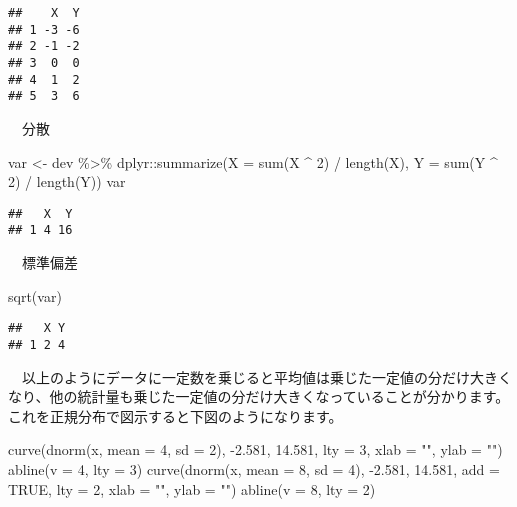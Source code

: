 \documentclass[
  12pt,
]{book}
\newenvironment{Shaded}{\begin{snugshade}}{\end{snugshade}}
\newcommand{\AttributeTok}[1]{\textcolor[rgb]{0.77,0.63,0.00}{#1}}
\newcommand{\ConstantTok}[1]{\textcolor[rgb]{0.00,0.00,0.00}{#1}}
\newcommand{\DecValTok}[1]{\textcolor[rgb]{0.00,0.00,0.81}{#1}}
\newcommand{\FloatTok}[1]{\textcolor[rgb]{0.00,0.00,0.81}{#1}}
\newcommand{\FunctionTok}[1]{\textcolor[rgb]{0.00,0.00,0.00}{#1}}
\newcommand{\NormalTok}[1]{#1}
\newcommand{\OtherTok}[1]{\textcolor[rgb]{0.56,0.35,0.01}{#1}}
\newcommand{\SpecialCharTok}[1]{\textcolor[rgb]{0.00,0.00,0.00}{#1}}
\newcommand{\StringTok}[1]{\textcolor[rgb]{0.31,0.60,0.02}{#1}}
\begin{document}
\begin{verbatim}
##    X  Y
## 1 -3 -6
## 2 -1 -2
## 3  0  0
## 4  1  2
## 5  3  6
\end{verbatim}

　分散

\begin{Shaded}
\begin{Highlighting}[]
\NormalTok{var }\OtherTok{\textless{}{-}}\NormalTok{ dev }\SpecialCharTok{\%\textgreater{}\%} 
\NormalTok{  dplyr}\SpecialCharTok{::}\FunctionTok{summarize}\NormalTok{(}\AttributeTok{X =} \FunctionTok{sum}\NormalTok{(X }\SpecialCharTok{\^{}} \DecValTok{2}\NormalTok{) }\SpecialCharTok{/} \FunctionTok{length}\NormalTok{(X), }\AttributeTok{Y =} \FunctionTok{sum}\NormalTok{(Y }\SpecialCharTok{\^{}} \DecValTok{2}\NormalTok{) }\SpecialCharTok{/} \FunctionTok{length}\NormalTok{(Y))}
\NormalTok{var}
\end{Highlighting}
\end{Shaded}

\begin{verbatim}
##   X  Y
## 1 4 16
\end{verbatim}

　標準偏差

\begin{Shaded}
\begin{Highlighting}[]
\FunctionTok{sqrt}\NormalTok{(var)}
\end{Highlighting}
\end{Shaded}

\begin{verbatim}
##   X Y
## 1 2 4
\end{verbatim}

　以上のようにデータに一定数を乗じると平均値は乗じた一定値の分だけ大きくなり、他の統計量も乗じた一定値の分だけ大きくなっていることが分かります。これを正規分布で図示すると下図のようになります。

\begin{Shaded}
\begin{Highlighting}[]
\FunctionTok{curve}\NormalTok{(}\FunctionTok{dnorm}\NormalTok{(x, }\AttributeTok{mean =} \DecValTok{4}\NormalTok{, }\AttributeTok{sd =} \DecValTok{2}\NormalTok{), }\SpecialCharTok{{-}}\FloatTok{2.581}\NormalTok{, }\FloatTok{14.581}\NormalTok{, }\AttributeTok{lty =} \DecValTok{3}\NormalTok{,}
      \AttributeTok{xlab =} \StringTok{""}\NormalTok{, }\AttributeTok{ylab =} \StringTok{""}\NormalTok{)}
\FunctionTok{abline}\NormalTok{(}\AttributeTok{v =} \DecValTok{4}\NormalTok{, }\AttributeTok{lty =} \DecValTok{3}\NormalTok{)}
\FunctionTok{curve}\NormalTok{(}\FunctionTok{dnorm}\NormalTok{(x, }\AttributeTok{mean =} \DecValTok{8}\NormalTok{, }\AttributeTok{sd =} \DecValTok{4}\NormalTok{), }\SpecialCharTok{{-}}\FloatTok{2.581}\NormalTok{, }\FloatTok{14.581}\NormalTok{, }\AttributeTok{add =} \ConstantTok{TRUE}\NormalTok{, }\AttributeTok{lty =} \DecValTok{2}\NormalTok{,}
      \AttributeTok{xlab =} \StringTok{""}\NormalTok{, }\AttributeTok{ylab =} \StringTok{""}\NormalTok{)}
\FunctionTok{abline}\NormalTok{(}\AttributeTok{v =} \DecValTok{8}\NormalTok{, }\AttributeTok{lty =} \DecValTok{2}\NormalTok{)}
\end{Highlighting}
\end{Shaded}
\end{document}
